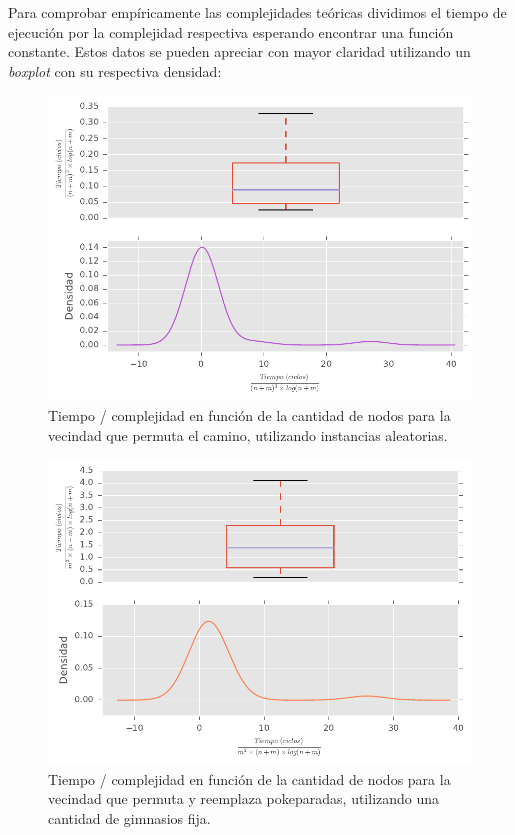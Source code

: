 Para comprobar emp\'iricamente las complejidades te\'oricas dividimos el tiempo de ejecuci\'on por la complejidad respectiva esperando encontrar una funci\'on constante. Estos datos se pueden apreciar con mayor claridad utilizando un \textit{boxplot} con su respectiva densidad:

\begin{figure}[H]
  \begin{center}
    \includegraphics{../experimentacion/ej3/expAleat_complejidad_permutaCamino.pdf}
    \caption{Tiempo / complejidad en funci\'on de la cantidad de nodos para la vecindad que permuta el camino, utilizando instancias aleatorias.}
    \label{fig:expAleat_complejidad_permutaCamino}
  \end{center}
\end{figure}

\begin{figure}[H]
  \begin{center}
    \includegraphics{../experimentacion/ej3/expFijo_complejidad_permutaYReemplazaPokeparadas_cantGimFija.pdf}
    \caption{Tiempo / complejidad en funci\'on de la cantidad de nodos para la vecindad que permuta y reemplaza pokeparadas, utilizando una cantidad de gimnasios fija.}
    \label{fig:expFijo_complejidad_permutaYReemplazaPokeparadas_cantGimFija}
  \end{center}
\end{figure}

